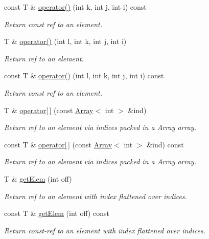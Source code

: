 \begin{DoxyCompactItemize}
const T \& \mbox{\hyperlink{classADAT_1_1ArrayNd_a1452ab01ffb2824ebcfa50ebbcdd7b8a}{operator()}} (int k, int j, int i) const
\begin{DoxyCompactList}\small\item\em Return const ref to an element. \end{DoxyCompactList}\item 
T \& \mbox{\hyperlink{classADAT_1_1ArrayNd_a0d3dfd90a9e68964948dbccb48b18f1d}{operator()}} (int l, int k, int j, int i)
\begin{DoxyCompactList}\small\item\em Return ref to an element. \end{DoxyCompactList}\item 
const T \& \mbox{\hyperlink{classADAT_1_1ArrayNd_aa2f8e4f6fa9a05745538791ba4f70aff}{operator()}} (int l, int k, int j, int i) const
\begin{DoxyCompactList}\small\item\em Return const ref to an element. \end{DoxyCompactList}\item 
T \& \mbox{\hyperlink{classADAT_1_1ArrayNd_a5689e9a64be5914877dc3882cc68a283}{operator\mbox{[}$\,$\mbox{]}}} (const \mbox{\hyperlink{classXMLArray_1_1Array}{Array}}$<$ int $>$ \&ind)
\begin{DoxyCompactList}\small\item\em Return ref to an element via indices packed in a Array array. \end{DoxyCompactList}\item 
const T \& \mbox{\hyperlink{classADAT_1_1ArrayNd_a3b7160cbd3939f68f4a23df8cc56d2df}{operator\mbox{[}$\,$\mbox{]}}} (const \mbox{\hyperlink{classXMLArray_1_1Array}{Array}}$<$ int $>$ \&ind) const
\begin{DoxyCompactList}\small\item\em Return ref to an element via indices packed in a Array array. \end{DoxyCompactList}\item 
T \& \mbox{\hyperlink{classADAT_1_1ArrayNd_abc5c56420a9625b236d4521acb083de2}{get\+Elem}} (int off)
\begin{DoxyCompactList}\small\item\em Return ref to an element with index flattened over indices. \end{DoxyCompactList}\item 
const T \& \mbox{\hyperlink{classADAT_1_1ArrayNd_a515368f71387996ee237309eb1f0cc2e}{get\+Elem}} (int off) const
\begin{DoxyCompactList}\small\item\em Return const-\/ref to an element with index flattened over indices. \end{DoxyCompactList}\end{DoxyCompactItemize}


